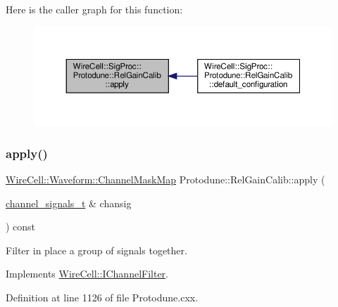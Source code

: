 Here is the caller graph for this function\+:
\nopagebreak
\begin{figure}[H]
\begin{center}
\leavevmode
\includegraphics[width=350pt]{class_wire_cell_1_1_sig_proc_1_1_protodune_1_1_rel_gain_calib_ae841532dd723111810c797fb13e0df3a_icgraph}
\end{center}
\end{figure}
\mbox{\label{class_wire_cell_1_1_sig_proc_1_1_protodune_1_1_rel_gain_calib_afa25d6774f5ea8bf33ba28494ef2a0f4}} 
\subsubsection{\texorpdfstring{apply()}{apply()}\hspace{0.1cm}{\footnotesize\ttfamily [2/2]}}
{\footnotesize\ttfamily \hyperlink{namespace_wire_cell_1_1_waveform_a18b9ae61c858e340252ba3ac83ac3bc0}{Wire\+Cell\+::\+Waveform\+::\+Channel\+Mask\+Map} Protodune\+::\+Rel\+Gain\+Calib\+::apply (\begin{DoxyParamCaption}\item[{\hyperlink{class_wire_cell_1_1_i_channel_filter_a44de35ce47701d84cd45393c6bcd5e2f}{channel\+\_\+signals\+\_\+t} \&}]{chansig }\end{DoxyParamCaption}) const\hspace{0.3cm}{\ttfamily [virtual]}}

Filter in place a group of signals together. 

Implements \hyperlink{class_wire_cell_1_1_i_channel_filter_a47554d77b1dca5596dc61e2221e0a137}{Wire\+Cell\+::\+I\+Channel\+Filter}.



Definition at line 1126 of file Protodune.\+cxx.

